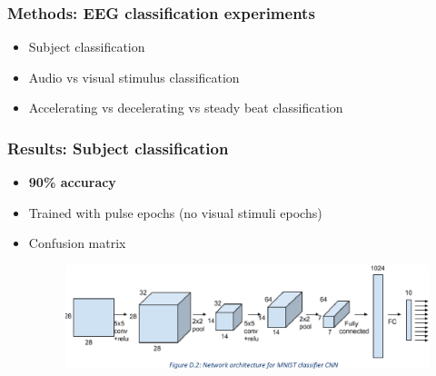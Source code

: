 \documentclass{beamer}
\begin{document}
\begin{frame}
	\frametitle{Methods: EEG classification experiments}

	\begin{itemize}
		
		\item Subject classification 

		\item Audio vs visual stimulus classification

		\item Accelerating vs decelerating vs steady beat classification

	\end{itemize}

\end{frame}

\begin{frame}
	\frametitle{Results: Subject classification}

	\begin{itemize}
		
		\item \textbf{90\% accuracy}

		\item Trained with pulse epochs (no visual stimuli epochs) 

		\item Confusion matrix
		\begin{figure}
			\centering
			\includegraphics[scale=1.0]{fig13.png}
		\end{figure}
	\end{itemize}

\end{frame}
\end{document}

